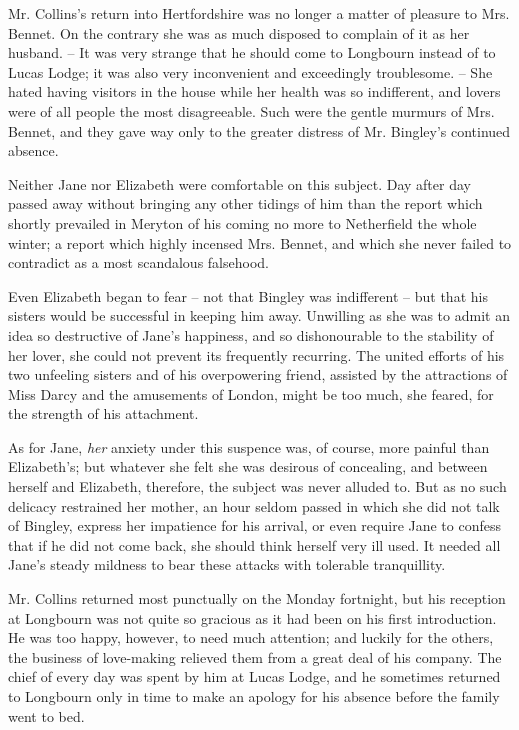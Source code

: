 Mr. Collins’s return into Hertfordshire was no longer
a matter of pleasure to Mrs. Bennet. On the contrary
she was as much disposed to complain of it as her
husband. -- It was very strange that he should come to
Longbourn instead of to Lucas Lodge; it was also very
inconvenient and exceedingly troublesome. -- She hated
having visitors in the house while her health was so
indifferent, and lovers were of all people the most disagreeable.
Such were the gentle murmurs of Mrs. Bennet,
and they gave way only to the greater distress of Mr.
Bingley’s continued absence.

Neither Jane nor Elizabeth were comfortable on this
subject. Day after day passed away without bringing
any other tidings of him than the report which shortly
prevailed in Meryton of his coming no more to Netherfield
the whole winter; a report which highly incensed Mrs.
Bennet, and which she never failed to contradict as a most
scandalous falsehood.

Even Elizabeth began to fear -- not that Bingley was
indifferent -- but that his sisters would be successful in
keeping him away. Unwilling as she was to admit an
idea so destructive of Jane’s happiness, and so dishonourable
to the stability of her lover, she could not prevent
its frequently recurring. The united efforts of his two
unfeeling sisters and of his overpowering friend, assisted
by the attractions of Miss Darcy and the amusements
of London, might be too much, she feared, for the strength
of his attachment.

As for Jane, \textit{her} anxiety under this suspence was, of
course, more painful than Elizabeth’s; but whatever she
felt she was desirous of concealing, and between herself
and Elizabeth, therefore, the subject was never alluded to.
But as no such delicacy restrained her mother, an hour
seldom passed in which she did not talk of Bingley, express
her impatience for his arrival, or even require Jane to
confess that if he did not come back, she should think
herself very ill used. It needed all Jane’s steady mildness
to bear these attacks with tolerable tranquillity.

Mr. Collins returned most punctually on the Monday
fortnight, but his reception at Longbourn was not quite
so gracious as it had been on his first introduction. He
was too happy, however, to need much attention; and
luckily for the others, the business of love-making relieved
them from a great deal of his company. The chief of
every day was spent by him at Lucas Lodge, and he
sometimes returned to Longbourn only in time to make
an apology for his absence before the family went to bed.

